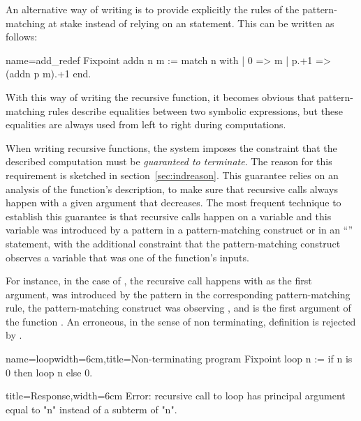 An alternative way of writing  is to provide explicitly the
rules of the pattern-matching at stake instead of relying on an 
statement. This can be written as follows:

\begin{coq}{name=add_redef}{}
Fixpoint addn n m :=
  match n with
  | 0 => m
  | p.+1 => (addn p m).+1
  end.
\end{coq}
With this way of writing the recursive function, it becomes obvious that
pattern-matching rules describe equalities between two symbolic
expressions, but these equalities are always used from left to right during
computations.

When writing recursive functions, the \Coq{} system imposes the
constraint that the described computation must be \emph{guaranteed to
terminate}.  The reason for this requirement is sketched in
section~\ref{sec:indreason}.
This guarantee relies on an analysis of the function's
description, to make sure that recursive calls always happen with a
given argument that decreases.  The most frequent technique to
establish this guarantee is that recursive calls happen on a variable
and this variable was introduced by a pattern in a pattern-matching
construct or in an ``'' statement, with the additional
constraint that the pattern-matching construct observes a variable
that was one of the function's inputs.

For instance, in the case of , the recursive call happens
with  as the first argument,  was introduced by the pattern 
in the corresponding pattern-matching rule, the pattern-matching
construct was observing , and  is the first argument of the
function .  An erroneous, in the sense of non terminating,
definition is rejected by \Coq{}.

\begin{coq}{name=loop}{width=6cm,title=Non-terminating program}
Fixpoint loop n :=
 if n is 0 then loop n else 0.
$~$
\end{coq}
\begin{coqout}{}{title=Response,width=6cm}
Error: recursive call to loop has
principal argument equal to  "n"
instead of a subterm of "n".
\end{coqout}

